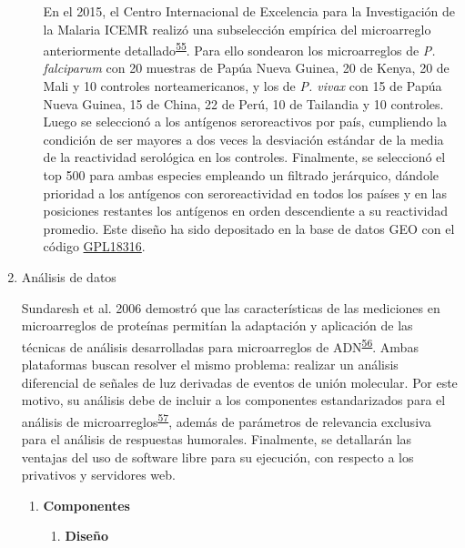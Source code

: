 \documentclass[]{article}
\begin{document}
\begin{enumerate}
\begin{enumerate}
    En el 2015, el Centro Internacional de Excelencia para la
    Investigación de la Malaria ICEMR realizó una subselección empírica
    del microarreglo anteriormente
    detallado\textsuperscript{\protect\hyperlink{ref-King2015FOC}{55}}.
    Para ello sondearon los microarreglos de \emph{P. falciparum} con 20
    muestras de Papúa Nueva Guinea, 20 de Kenya, 20 de Mali y 10
    controles norteamericanos, y los de \emph{P. vivax} con 15 de Papúa
    Nueva Guinea, 15 de China, 22 de Perú, 10 de Tailandia y 10
    controles. Luego se seleccionó a los antígenos seroreactivos por
    país, cumpliendo la condición de ser mayores a dos veces la
    desviación estándar de la media de la reactividad serológica en los
    controles. Finalmente, se seleccionó el top 500 para ambas especies
    empleando un filtrado jerárquico, dándole prioridad a los antígenos
    con seroreactividad en todos los países y en las posiciones
    restantes los antígenos en orden descendiente a su reactividad
    promedio. Este diseño ha sido depositado en la base de datos GEO con
    el código
    \href{https://www.ncbi.nlm.nih.gov/geo/query/acc.cgi?acc=GPL18316}{GPL18316}.
  \end{enumerate}
\item
  Análisis de datos

  Sundaresh et al. 2006 demostró que las características de las
  mediciones en microarreglos de proteínas permitían la adaptación y
  aplicación de las técnicas de análisis desarrolladas para
  microarreglos de
  ADN\textsuperscript{\protect\hyperlink{ref-sundaresh2006}{56}}. Ambas
  plataformas buscan resolver el mismo problema: realizar un análisis
  diferencial de señales de luz derivadas de eventos de unión molecular.
  Por este motivo, su análisis debe de incluir a los componentes
  estandarizados para el análisis de
  microarreglos\textsuperscript{\protect\hyperlink{ref-allison2006}{57}},
  además de parámetros de relevancia exclusiva para el análisis de
  respuestas humorales. Finalmente, se detallarán las ventajas del uso
  de software libre para su ejecución, con respecto a los privativos y
  servidores web.

  \begin{enumerate}
  \def\labelenumii{\roman{enumii}.}
  \item
    \textbf{Componentes}

    \begin{enumerate}
    \def\labelenumiii{\arabic{enumiii}.}
    \item
      \textbf{Diseño}


\end{enumerate}
\end{enumerate}
\end{enumerate}
\end{document}

